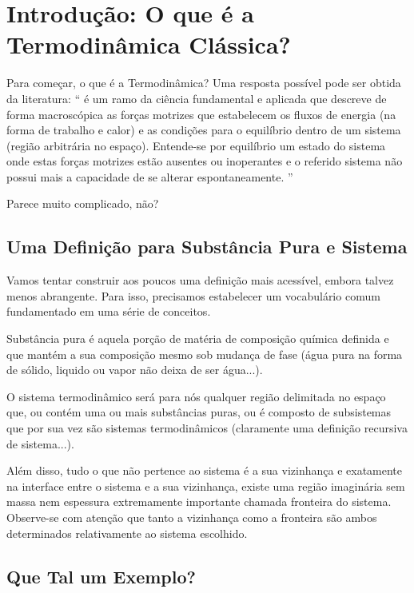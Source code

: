 \chapter{Introdução: O que é a Termodinâmica Clássica?}
\label{chap:introduction}

    Para começar, o que é a Termodinâmica? Uma resposta possível pode ser
    obtida da literatura:
    \enquote{%
        é um ramo da ciência fundamental e aplicada
        que descreve de forma macroscópica as forças motrizes que estabelecem
        os fluxos de energia (na forma de trabalho e calor) e as condições para
        o equilíbrio dentro de um sistema (região arbitrária no espaço).
        Entende-se por equilíbrio um estado do sistema onde estas forças
        motrizes estão ausentes ou inoperantes e o referido sistema não possui
        mais a capacidade de se alterar espontaneamente.%
    }

    Parece muito complicado, não?

    \section{Uma Definição para Substância Pura e Sistema}

    Vamos tentar construir aos poucos uma definição mais acessível, embora
    talvez menos abrangente. Para isso, precisamos estabelecer um vocabulário
    comum fundamentado em uma série de conceitos.

    Substância pura é aquela porção de matéria de composição química definida e
    que mantém a sua composição mesmo sob mudança de fase (água pura na forma
    de sólido, liquido ou vapor não deixa de ser água...).

    O sistema termodinâmico será para nós qualquer região delimitada no espaço
    que, ou contém uma ou mais substâncias puras, ou é composto de subsistemas
    que por sua vez são sistemas termodinâmicos (claramente uma definição
    recursiva de sistema...).

    Além disso, tudo o que não pertence ao sistema é a sua vizinhança e
    exatamente na interface entre o sistema e a sua vizinhança, existe uma
    região imaginária sem massa nem espessura extremamente importante chamada
    fronteira do sistema. Observe-se com atenção que tanto a vizinhança como a
    fronteira são ambos determinados relativamente ao sistema escolhido.


    \section{Que Tal um Exemplo?}


